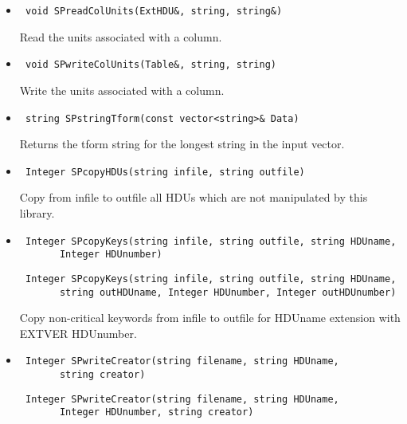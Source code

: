 \documentclass[11pt]{book}
\begin{document}
\begin{itemize}

\item  \begin{verbatim} void SPreadColUnits(ExtHDU&, string, string&) \end{verbatim}

          Read the units associated with a column.

\item  \begin{verbatim} void SPwriteColUnits(Table&, string, string) \end{verbatim}

          Write the units associated with a column.

\item  \begin{verbatim} string SPstringTform(const vector<string>& Data) \end{verbatim}

          Returns the tform string for the longest string in the input vector.

\item  \begin{verbatim} Integer SPcopyHDUs(string infile, string outfile) \end{verbatim}

          Copy from infile to outfile all HDUs which are not manipulated by this library. 

\item  \begin{verbatim} Integer SPcopyKeys(string infile, string outfile, string HDUname, 
       Integer HDUnumber) \end{verbatim}
       \begin{verbatim} Integer SPcopyKeys(string infile, string outfile, string HDUname, 
       string outHDUname, Integer HDUnumber, Integer outHDUnumber) \end{verbatim}

          Copy non-critical keywords from infile to outfile for HDUname 
          extension with EXTVER HDUnumber.

\item  \begin{verbatim} Integer SPwriteCreator(string filename, string HDUname,
       string creator) \end{verbatim}
       \begin{verbatim} Integer SPwriteCreator(string filename, string HDUname,
       Integer HDUnumber, string creator) \end{verbatim}


\end{itemize}
\end{document}
